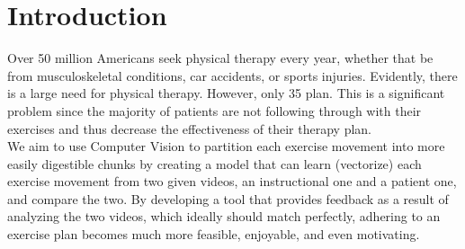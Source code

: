 \section{Introduction}
\label{sec:intro}

\indent Over 50 million Americans seek physical therapy every year, whether that be from 
musculoskeletal conditions, car accidents, or sports injuries. Evidently, there is a large
need for physical therapy. However, only 35%
plan. This is a significant problem since the majority of patients are not following 
through with their exercises and thus decrease the effectiveness of their therapy plan.
\\
\indent We aim to use Computer Vision to partition each exercise movement into more easily digestible chunks 
by creating a model that can learn (vectorize) each exercise movement from two given videos, an instructional 
one and a patient one, and compare the two. By developing a tool that provides feedback as a result of analyzing 
the two videos, which ideally should match perfectly, adhering to an exercise plan 
becomes much more feasible, enjoyable, and even motivating.

